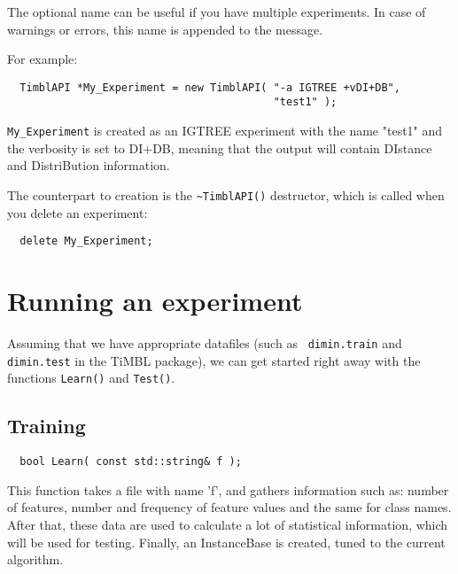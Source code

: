 \documentclass{report}
\begin{document}
The optional name can be useful if you have multiple experiments.
In case of warnings or errors, this name is appended to the message.

For example:

\begin{footnotesize}
\begin{verbatim}
  TimblAPI *My_Experiment = new TimblAPI( "-a IGTREE +vDI+DB", 
                                          "test1" );
\end{verbatim}
\end{footnotesize}

{\tt My\_Experiment} is created as an IGTREE experiment with the name
"test1" and the verbosity is set to DI+DB, meaning that the output
will contain DIstance and DistriBution information.

The counterpart to creation is the {\tt \~{ }TimblAPI()} destructor,
which is called when you delete an experiment:

\begin{footnotesize}
\begin{verbatim}
  delete My_Experiment;
\end{verbatim}
\end{footnotesize}

\section{Running an experiment}

Assuming that we have appropriate datafiles (such as {\tt
dimin.train} and {\tt dimin.test} in the TiMBL package), we can get
started right away with the functions {\tt Learn()} and {\tt Test()}.

\subsection{Training}
\begin{footnotesize}
\begin{verbatim}
  bool Learn( const std::string& f );
\end{verbatim}
\end{footnotesize}

This function takes a file with name 'f', and gathers information
such as: number of features, number and frequency of feature values and
the same for class names. After that, these data are used to calculate
a lot of statistical information, which will be used for
testing. Finally, an InstanceBase is created, tuned to the current
algorithm.
\end{document}
